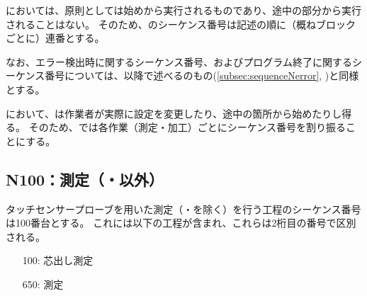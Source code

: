 \DMC においては、原則として\CreatedNCSubPrg は始めから実行されるものであり、途中の部分から実行されることはない。
そのため、\nameCreatedNCSubPrg のシーケンス番号は記述の順に（概ねブロックごとに）連番とする。

なお、エラー検出時に関するシーケンス番号、およびプログラム終了に関するシーケンス番号については、以降で述べる\CreatedNCMainPrg のもの(\autoref{subsec:sequenceNerror}, )と同様とする。



\clearpage
\DMC において、\CreatedNCMainPrg は作業者が実際に設定を変更したり、途中の箇所から始めたりし得る。
そのため、\CreatedNCMainPrg では各作業（測定・加工）ごとにシーケンス番号を割り振ることにする。


\subsection{N100：測定（\Dimple・\ReliefGroove 以外）}
タッチセンサープローブを用いた測定（\Dimple ・\ReliefGroove を除く）を行う工程のシーケンス番号は100番台とする。
これには以下の工程が含まれ、これらは2桁目の番号で区別される。
\begin{enumerate}
\item[100:] 芯出し測定
\item[650:] \nameCenterlineEndFaceDif 測定
\end{enumerate}


